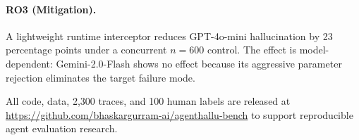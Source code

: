 \documentclass[11pt]{article}
\begin{document}
\paragraph{RO3 (Mitigation).}
A lightweight runtime interceptor reduces GPT-4o-mini hallucination by
23 percentage points under a concurrent $n{=}600$ control.
The effect is model-dependent: Gemini-2.0-Flash shows no effect because
its aggressive parameter rejection eliminates the target failure mode.

All code, data, 2{,}300 traces, and 100 human labels are released at
\url{https://github.com/bhaskargurram-ai/agenthallu-bench} to support
reproducible agent evaluation research.




\end{document}
